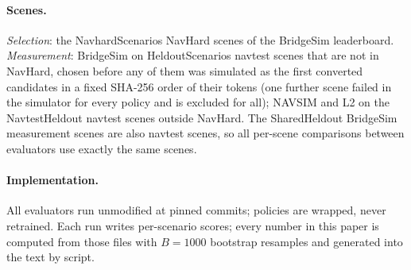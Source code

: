 \paragraph{Scenes.}
\emph{Selection}: the \num{NavhardScenarios} NavHard scenes of the BridgeSim leaderboard.
\emph{Measurement}: BridgeSim on \num{HeldoutScenarios} navtest scenes that are not in NavHard,
chosen before any of them was simulated as the first converted candidates in a fixed SHA-256 order of
their tokens (one further scene failed in the simulator for every policy and is excluded for all);
NAVSIM and L2 on the \num{NavtestHeldout} navtest scenes outside NavHard.
The \num{SharedHeldout} BridgeSim measurement scenes are also navtest scenes, so all per-scene
comparisons between evaluators use exactly the same scenes.

\paragraph{Implementation.}
All evaluators run unmodified at pinned commits; policies are wrapped, never retrained.
Each run writes per-scenario scores; every number in this paper is computed from those files with
$B=1000$ bootstrap resamples and generated into the text by script.
